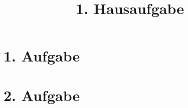\documentclass[a4paper]{homework}
\title{1. Hausaufgabe}
\institute{TU Berlin}
\begin{document}
\maketitle

\section{1. Aufgabe}
\newpage
\section{2. Aufgabe}
\end{document}

